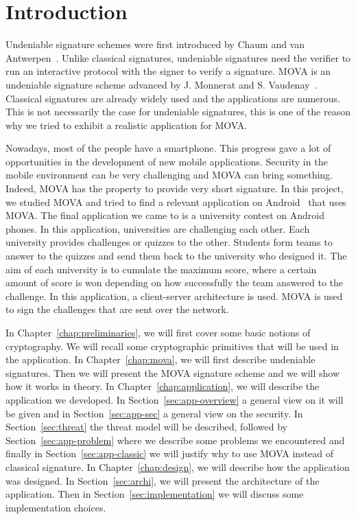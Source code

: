\chapter{Introduction}
\label{chap:introduction}

Undeniable signature schemes were first introduced by Chaum and van Antwerpen~\cite{cite:chaum}.
Unlike classical signatures, undeniable signatures need the verifier to run an interactive protocol with the signer to verify a signature.
MOVA is an undeniable signature scheme advanced by J. Monnerat and S. Vaudenay~\cite{cite:thesis-monnerat,cite:2-move,cite:mova-crypto-journal,cite:opti-mova,cite:generic-mova}.
Classical signatures are already widely used and the applications are numerous. 
This is not necessarily the case for undeniable signatures, this is one of the reason why we tried to 
exhibit a realistic application for MOVA.

Nowadays, most of the people have a smartphone. This progress gave a lot of opportunities in the development of new mobile applications.  
Security in the mobile environment can be very challenging and MOVA can bring something. Indeed, MOVA has the property to provide very short signature.
In this project, we studied MOVA and tried to find a relevant application on Android~\cite{cite:android} that uses MOVA.
The final application we came to is a university contest on Android phones. In this application, universities are challenging each other. Each university provides challenges or quizzes 
to the other. Students form teams to answer to the quizzes and send them back to the university who designed it. The aim of each university is to cumulate the maximum score, where a certain amount of 
score is won depending on how successfully the team answered to the challenge. In this application, a client-server architecture is used. MOVA is used to sign the challenges that are sent over the network.

In Chapter~\ref{chap:preliminaries}, we will first cover some basic notions of cryptography.
We will recall some cryptographic primitives that will be used in the application.
In Chapter~\ref{chap:mova}, we will first describe undeniable signatures. Then we will present the MOVA signature scheme and we will show how it works in theory.
In Chapter~\ref{chap:application}, we will describe the application we developed. In Section~\ref{sec:app-overview} a general
view on it will be given and in Section~\ref{sec:app-sec} a general view on the security. In Section~\ref{sec:threat} the threat model will be described, followed by Section~\ref{sec:app-problem} where we describe some problems we encountered and finally 
in Section~\ref{sec:app-classic} we will justify why to use MOVA instead of classical signature.
In Chapter~\ref{chap:design}, we will describe how the application was designed. 
In Section~\ref{sec:archi}, we will present the architecture of the application.
Then in Section~\ref{sec:implementation} we will discuss some implementation choices.


